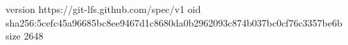 version https://git-lfs.github.com/spec/v1
oid sha256:5cefc45a96685bc8ee9467d1c8680da0b2962093c874b037bc0cf76c3357be6b
size 2648
